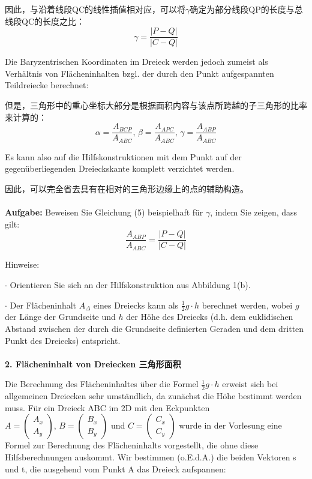 \documentclass[fleqn]{article}
\begin{document}
因此，与沿着线段QC的线性插值相对应，可以将$\gamma$确定为部分线段QP的长度与总线段QC的长度之比：
$$\gamma = \frac{|P-Q|}{|C-Q|}$$

Die Baryzentrischen Koordinaten im Dreieck werden jedoch zumeist als Verhältnis von Flächeninhalten bzgl. der durch den Punkt aufgespannten Teildreiecke berechnet:

但是，三角形中的重心坐标大部分是根据面积内容与该点所跨越的子三角形的比率来计算的：
$$\alpha = \frac{A_{BCP}}{A_{ABC}},\,\beta=\frac{A_{APC}}{A_{ABC}},\,\gamma=\frac{A_{ABP}}{A_{ABC}}$$

Es kann also auf die Hilfskonstruktionen mit dem Punkt auf der gegenüberliegenden Dreieckskante komplett verzichtet werden.

因此，可以完全省去具有在相对的三角形边缘上的点的辅助构造。
\\
\\
\noindent\textbf{Aufgabe:} Beweisen Sie Gleichung (5) beispielhaft für $\gamma$, indem Sie zeigen, dass gilt:
$$\frac{A_{ABP}}{A_{ABC}}=\frac{|P-Q|}{|C-Q|}$$

Hinweise: 

$\cdot$ Orientieren Sie sich an der Hilfskonstruktion aus Abbildung 1(b).  

$\cdot$ Der Flächeninhalt $A_\Delta$ eines Dreiecks kann als $\frac{1}{2}g\cdot h$ berechnet werden, 
 wobei $g$ der Länge der Grundseite und $h$ der Höhe des Dreiecks (d.h. dem euklidischen Abstand zwischen der durch die Grundseite definierten Geraden und dem dritten Punkt des Dreiecks) entspricht.
\\
\\
\noindent\textbf{2. Flächeninhalt von Dreiecken 三角形面积}

Die Berechnung des Flächeninhaltes über die Formel $\frac{1}{2}g\cdot h$ erweist sich bei allgemeinen Dreiecken sehr umständlich, da zunächst die Höhe bestimmt werden muss. Für ein Dreieck ABC im 2D mit den Eckpunkten
$A=\begin{pmatrix}
    A_x\\A_y
\end{pmatrix},\,B=\begin{pmatrix}
    B_x\\B_y
\end{pmatrix}$ und $C=\begin{pmatrix}
    C_x\\C_y
\end{pmatrix}$ wurde in der Vorlesung eine Formel zur Berechnung des Flächeninhalts vorgestellt, die ohne diese Hilfsberechnungen auskommt. Wir bestimmen (o.E.d.A.) die beiden Vektoren s und t, die ausgehend vom Punkt A das Dreieck aufspannen:
\end{document}
